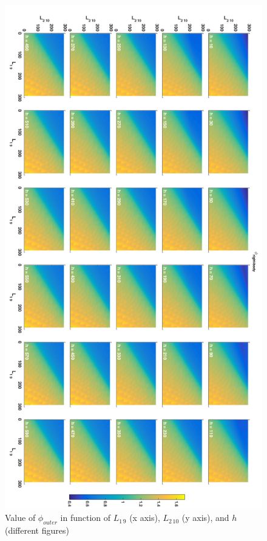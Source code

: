 \begin{figure}
	\includegraphics[width=1.0\linewidth]{figs/05/sim/phiright}
	\caption{Value of $\phi_{outer}$ in function of $L_{1\,9}$ (x axis), $L_{2\,10}$ (y axis), and $h$ (different figures)}
	\label{phiright}
\end{figure}

